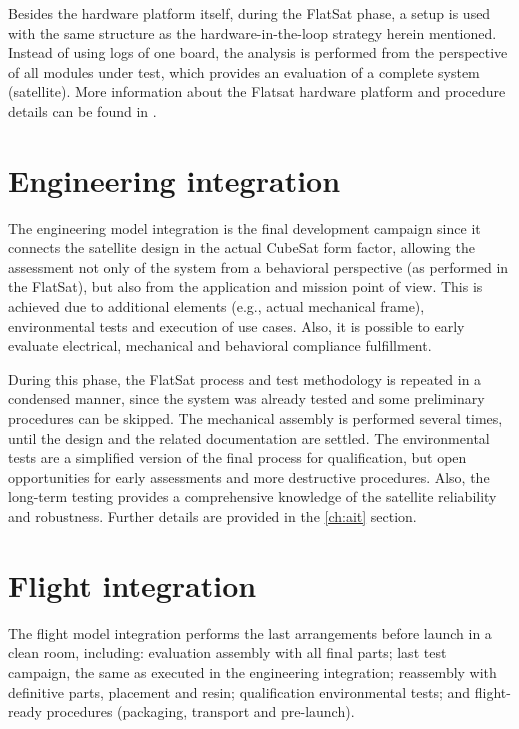 Besides the hardware platform itself, during the FlatSat phase, a setup is used with the same structure as the hardware-in-the-loop strategy herein mentioned. Instead of using logs of one board, the analysis is performed from the perspective of all modules under test, which provides an evaluation of a complete system (satellite). More information about the Flatsat hardware platform and procedure details can be found in \cite{flatsat}.


\section{Engineering integration}

The engineering model integration is the final development campaign since it connects the satellite design in the actual CubeSat form factor, allowing the assessment not only of the system from a behavioral perspective (as performed in the FlatSat), but also from the application and mission point of view. This is achieved due to additional elements (e.g., actual mechanical frame), environmental tests and execution of use cases. Also, it is possible to early evaluate electrical, mechanical and behavioral compliance fulfillment.

During this phase, the FlatSat process and test methodology is repeated in a condensed manner, since the system was already tested and some preliminary procedures can be skipped. The mechanical assembly is performed several times, until the design and the related documentation are settled. The environmental tests are a simplified version of the final process for qualification, but open opportunities for early assessments and more destructive procedures. Also, the long-term testing provides a comprehensive knowledge of the satellite reliability and robustness. Further details are provided in the \autoref{ch:ait} section.


\section{Flight integration}

The flight model integration performs the last arrangements before launch in a clean room, including: evaluation assembly with all final parts; last test campaign, the same as executed in the engineering integration; reassembly with definitive parts, placement and resin; qualification environmental tests; and flight-ready procedures (packaging, transport and pre-launch).

